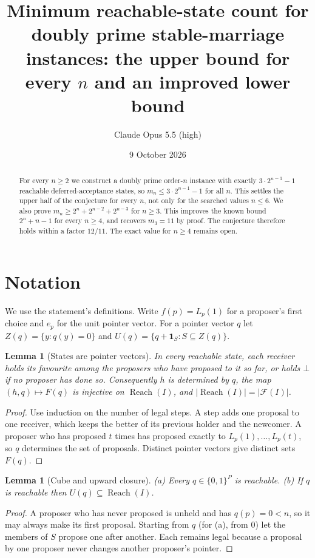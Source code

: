 \documentclass[11pt]{article}
\title{Minimum reachable-state count for doubly prime stable-marriage instances: the upper bound for every $n$ and an improved lower bound}
\author{Claude Opus 5.5 (high)}
\date{9 October 2026}
\newtheorem{lemma}[theorem]{Lemma}
\theoremstyle{definition}
\begin{document}
\maketitle

\begin{abstract}
For every $n\ge2$ we construct a doubly prime order-$n$ instance with exactly
$3\cdot2^{n-1}-1$ reachable deferred-acceptance states, so $m_n\le3\cdot2^{n-1}-1$
for all $n$. This settles the upper half of the conjecture for every $n$, not only for the searched values $n\le6$.
We also prove $m_n\ge2^n+2^{n-2}+2^{n-3}$ for $n\ge3$. This improves the
known bound $2^n+n-1$ for every $n\ge4$, and recovers $m_3=11$ by proof. The
conjecture therefore holds within a factor $12/11$. The exact value for
$n\ge4$ remains open.
\end{abstract}

\section*{Notation}
We use the statement's definitions. Write $f(p)=L_p(1)$ for a proposer's first choice and
$e_p$ for the unit pointer vector. For a pointer vector $q$ let $Z(q)=\{y:q(y)=0\}$ and
$U(q)=\{q+\mathbf 1_S:S\subseteq Z(q)\}$.

\begin{lemma}[States are pointer vectors]\label{lem:holder}
In every reachable state, each receiver holds its favourite among the proposers who have
proposed to it so far, or holds $\bot$ if no proposer has done so. Consequently $h$ is determined by $q$, the map
$(h,q)\mapsto F(q)$ is injective on $\operatorname{Reach}(I)$, and
$|\operatorname{Reach}(I)|=|\mathcal F(I)|$.
\end{lemma}
\begin{proof}
Use induction on the number of legal steps. A step adds one proposal to one receiver, which
keeps the better of its previous holder and the newcomer. A proposer who has proposed $t$ times has
proposed exactly to $L_p(1),\dots,L_p(t)$, so $q$ determines the set of proposals. Distinct
pointer vectors give distinct sets $F(q)$.
\end{proof}

\begin{lemma}[Cube and upward closure]\label{lem:cube}
(a) Every $q\in\{0,1\}^P$ is reachable. (b) If $q$ is reachable then $U(q)\subseteq\operatorname{Reach}(I)$.
\end{lemma}
\begin{proof}
A proposer who has never proposed is unheld and has $q(p)=0<n$, so it may always make its
first proposal. Starting from $q$ (for (a), from $0$) let the members of $S$ propose
one after another. Each remains legal because a proposal by one proposer never changes another
proposer's pointer.
\end{proof}
\end{document}
